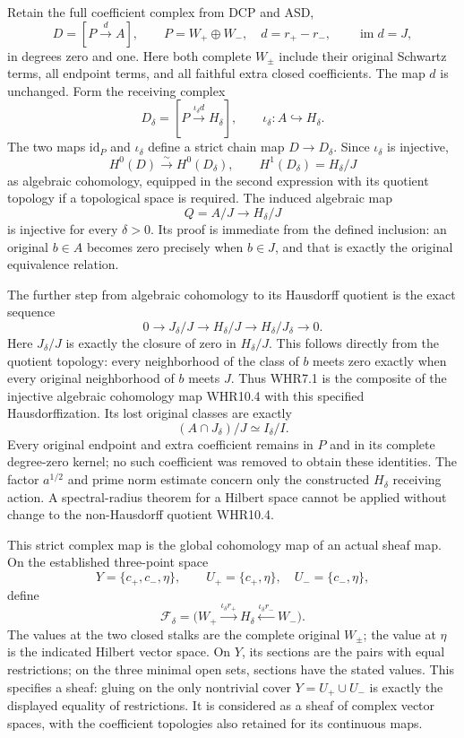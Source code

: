 Retain the full coefficient complex from DCP and ASD, \[
 D=[P\xrightarrow{d}A],\qquad P=W_+\oplus W_-,
 \quad d=r_+-r_-,\qquad\operatorname{im}d=J,
 \tag{WHR10.1}
\] in degrees zero and one. Here both complete \(W_\pm\) include their
original Schwartz terms, all endpoint terms, and all faithful extra
closed coefficients. The map \(d\) is unchanged. Form the receiving
complex \[
 D_\delta=[P\xrightarrow{\iota_\delta d}H_\delta],
 \qquad \iota_\delta:A\hookrightarrow H_\delta.
 \tag{WHR10.2}
\] The two maps \(\mathrm{id}_P\) and \(\iota_\delta\) define a strict
chain map \(D\to D_\delta\). Since \(\iota_\delta\) is injective, \[
 H^0(D)\xrightarrow{\sim}H^0(D_\delta),
 \qquad H^1(D_\delta)=H_\delta/J
 \tag{WHR10.3}
\] as algebraic cohomology, equipped in the second expression with its
quotient topology if a topological space is required. The induced
algebraic map \[
 Q=A/J\longrightarrow H_\delta/J
 \tag{WHR10.4}
\] is injective for every \(\delta>0\). Its proof is immediate from the
defined inclusion: an original \(b\in A\) becomes zero precisely when
\(b\in J\), and that is exactly the original equivalence relation.

The further step from algebraic cohomology to its Hausdorff quotient is
the exact sequence \[
 0\longrightarrow J_\delta/J\longrightarrow H_\delta/J
       \longrightarrow H_\delta/J_\delta\longrightarrow0.
 \tag{WHR10.5}
\] Here \(J_\delta/J\) is exactly the closure of zero in \(H_\delta/J\).
This follows directly from the quotient topology: every neighborhood of
the class of \(b\) meets zero exactly when every original neighborhood
of \(b\) meets \(J\). Thus WHR7.1 is the composite of the injective
algebraic cohomology map WHR10.4 with this specified Hausdorffization.
Its lost original classes are exactly \[
 (A\cap J_\delta)/J\simeq I_\delta/I.
 \tag{WHR10.6}
\] Every original endpoint and extra coefficient remains in \(P\) and in
its complete degree-zero kernel; no such coefficient was removed to
obtain these identities. The factor \(a^{1/2}\) and prime norm estimate
concern only the constructed \(H_\delta\) receiving action. A
spectral-radius theorem for a Hilbert space cannot be applied without
change to the non-Hausdorff quotient WHR10.4.

This strict complex map is the global cohomology map of an actual sheaf
map. On the established three-point space \[
Y=\{c_+,c_-,\eta\},\qquad
U_+=\{c_+,\eta\},\quad U_-=\{c_-,\eta\},
\] define \[
\mathcal F_\delta=
\bigl(W_+\xrightarrow{\iota_\delta r_+}H_\delta
                  \xleftarrow{\iota_\delta r_-}W_-\bigr).
\tag{WHR10.7}
\] The values at the two closed stalks are the complete original
\(W_\pm\); the value at \(\eta\) is the indicated Hilbert vector space.
On \(Y\), its sections are the pairs with equal restrictions; on the
three minimal open sets, sections have the stated values. This specifies
a sheaf: gluing on the only nontrivial cover \(Y=U_+\cup U_-\) is
exactly the displayed equality of restrictions. It is considered as a
sheaf of complex vector spaces, with the coefficient topologies also
retained for its continuous maps.

